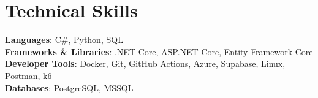 \documentclass[letterpaper,11pt]{article}
\begin{document}
%
\section{Technical Skills}
 \begin{itemize}[leftmargin=0.15in, label={}]
    \small{\item{
     \textbf{Languages}{: C\#, Python, SQL} \\
     \textbf{Frameworks \& Libraries}{: .NET Core, ASP.NET Core, Entity Framework Core} \\
     \textbf{Developer Tools}{: Docker, Git, GitHub Actions, Azure, Supabase, Linux, Postman, k6} \\
     \textbf{Databases}{: PostgreSQL, MSSQL}}}
 \end{itemize}




\end{document}
